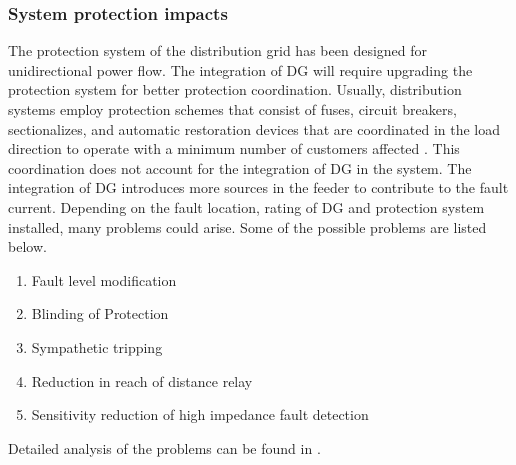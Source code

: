 \subsubsection{System protection impacts}
The protection system of the distribution grid has been designed for unidirectional power flow. The integration of DG will require upgrading the protection system for better protection coordination. Usually, distribution systems employ protection schemes that consist of fuses, circuit breakers, sectionalizes, and automatic restoration devices that are coordinated in the load direction to operate with a minimum number of customers affected \cite{PRO1}. This coordination does not account for the integration of DG in the system. The integration of DG introduces more sources in the feeder to contribute to the fault current. Depending on the fault location, rating of DG and protection system installed, many problems could arise. Some of the possible problems are listed below.
\begin{enumerate}
    \item Fault level modification
    \item Blinding of Protection
    \item Sympathetic tripping
    \item Reduction in reach of distance relay
    \item Sensitivity reduction of high impedance fault detection
\end{enumerate}
Detailed analysis of the problems can be found in \cite{PRO2}.




